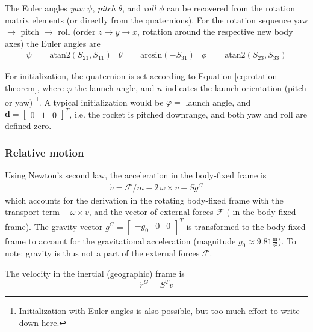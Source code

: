 The Euler angles \textit{yaw} $\psi$, \textit{pitch} $\theta$, and \textit{roll} $\phi$ can be recovered from the rotation matrix elements (or directly from the quaternions). 
For the rotation sequence yaw $\to$ pitch $\to$ roll (order $z\to y \to x$, rotation around the respective new body axes) the Euler angles are 
\begin{align}
    \psi &= \mathrm{atan2}(S_{21}, S_{11}) &
    \theta &= \mathrm{arcsin}(-S_{31}) &
    \phi &= \mathrm{atan2}(S_{23}, S_{33}) 
    \label{eq:quaternion2euler}
\end{align}

For initialization, the quaternion is set according to Equation \ref{eq:rotation-theorem}, where $\varphi$ the launch angle, and $n$ indicates the launch orientation (pitch or yaw) \footnote{Initialization with Euler angles is also possible\cite[p. 126]{zipfel2007}, but too much effort to write down here.}.
A typical initialization would be $\varphi = $ launch angle, and $\bm d = [\begin{smallmatrix} 0 & 1 & 0 \end{smallmatrix}]^T$, i.e. the rocket is pitched downrange, and both yaw and roll are defined zero.

\subsubsection{Relative motion}
Using Newton's second law, the acceleration in the body-fixed frame is \cite{zipfel2007, stevens2015}
\begin{align}
    \dot v = \mathcal{F}/m - 2 \, \omega \times v + S g^G
    \label{eq:model-vel-deriv}
\end{align}
which accounts for the derivation in the rotating body-fixed frame with the transport term $- \, \omega \times v$, and the vector of external forces $\mathcal{F}$ ( in the body-fixed frame).
The gravity vector $g^G = \begin{bmatrix} -g_0 & 0 & 0 \end{bmatrix}^T$ is transformed to the body-fixed frame to account for the gravitational acceleration (magnitude $g_0 \approx 9.81 \frac{\mathrm{m}}{\mathrm{s}^2}$).
To note: gravity is thus not a part of the external forces $\mathcal{F}$.

The velocity in the inertial (geographic) frame is \cite{zipfel2007}
\begin{equation}
    \dot r^G = S^T v
    \label{eq:model-pos-deriv}
\end{equation}

